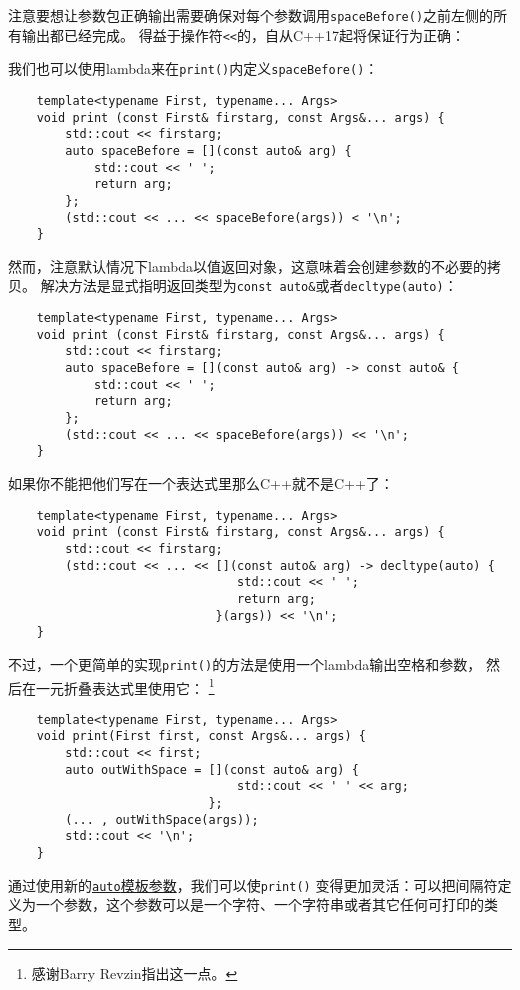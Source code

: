 注意要想让参数包正确输出需要确保对每个参数调用\texttt{spaceBefore()}之前左侧的所有输出都已经完成。
得益于操作符\texttt{<<}的，自从C++17起将保证行为正确：

我们也可以使用lambda来在\texttt{print()}内定义\texttt{spaceBefore()}：
\begin{lstlisting}
    template<typename First, typename... Args>
    void print (const First& firstarg, const Args&... args) {
        std::cout << firstarg;
        auto spaceBefore = [](const auto& arg) {
            std::cout << ' ';
            return arg;
        };
        (std::cout << ... << spaceBefore(args)) < '\n';
    }
\end{lstlisting}
然而，注意默认情况下lambda以值返回对象，这意味着会创建参数的不必要的拷贝。
解决方法是显式指明返回类型为\texttt{const auto\&}或者\texttt{decltype(auto)}：
\begin{lstlisting}
    template<typename First, typename... Args>
    void print (const First& firstarg, const Args&... args) {
        std::cout << firstarg;
        auto spaceBefore = [](const auto& arg) -> const auto& {
            std::cout << ' ';
            return arg;
        };
        (std::cout << ... << spaceBefore(args)) << '\n';
    }
\end{lstlisting}
如果你不能把他们写在一个表达式里那么C++就不是C++了：
\begin{lstlisting}
    template<typename First, typename... Args>
    void print (const First& firstarg, const Args&... args) {
        std::cout << firstarg;
        (std::cout << ... << [](const auto& arg) -> decltype(auto) {
                                std::cout << ' ';
                                return arg;
                             }(args)) << '\n';
    }
\end{lstlisting}
不过，一个更简单的实现\texttt{print()}的方法是使用一个lambda输出空格和参数，
然后在一元折叠表达式里使用它：
\footnote{感谢Barry Revzin指出这一点。}
\begin{lstlisting}
    template<typename First, typename... Args>
    void print(First first, const Args&... args) {
        std::cout << first;
        auto outWithSpace = [](const auto& arg) {
                                std::cout << ' ' << arg;
                            };
        (... , outWithSpace(args));
        std::cout << '\n';
    }
\end{lstlisting}
通过使用新的\hyperref[ch13.1.1]{\texttt{auto}模板参数}，我们可以使\texttt{print()}
变得更加灵活：可以把间隔符定义为一个参数，这个参数可以是一个字符、一个字符串或者其它任何可打印的类型。

